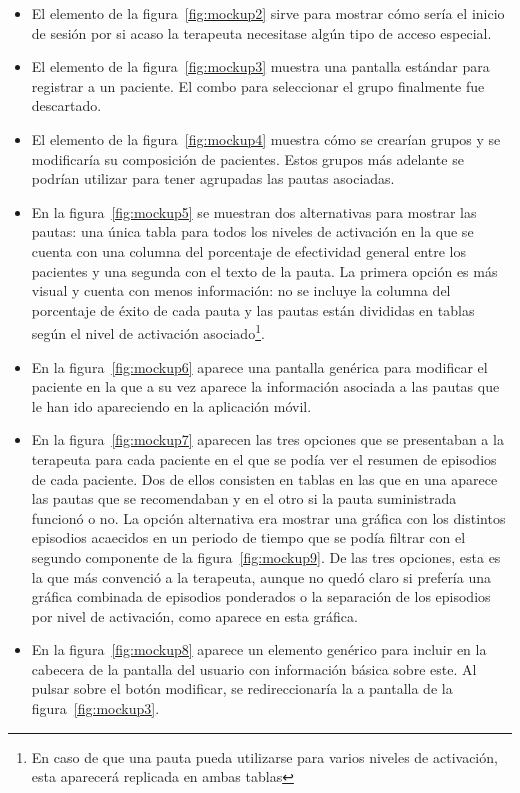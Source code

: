 \begin{itemize}
    \item El elemento de la figura~\ref{fig:mockup2} sirve para mostrar cómo sería el inicio de sesión por si acaso la terapeuta necesitase algún tipo de acceso especial.
    \item El elemento de la figura~\ref{fig:mockup3} muestra una pantalla estándar para registrar a un paciente. El combo para seleccionar el grupo finalmente fue descartado.
    \item El elemento de la figura~\ref{fig:mockup4} muestra cómo se crearían grupos y se modificaría su composición de pacientes. Estos grupos más adelante se podrían utilizar para tener agrupadas las pautas asociadas.
    \item En la figura~\ref{fig:mockup5} se muestran dos alternativas para mostrar las pautas: una única tabla para todos los niveles de activación en la que se cuenta con una columna del porcentaje de efectividad general entre los pacientes y una segunda con el texto de la pauta. La primera opción es más visual y cuenta con menos información: no se incluye la columna del porcentaje de éxito de cada pauta y las pautas están divididas en tablas según el nivel de activación asociado\footnote{En caso de que una pauta pueda utilizarse para varios niveles de activación, esta aparecerá replicada en ambas tablas}.
    \item En la figura~\ref{fig:mockup6} aparece una pantalla genérica para modificar el paciente en la que a su vez aparece la información asociada a las pautas que le han ido apareciendo en la aplicación móvil.
    \item En la figura~\ref{fig:mockup7} aparecen las tres opciones que se presentaban a la terapeuta para cada paciente en el que se podía ver el resumen de episodios de cada paciente. Dos de ellos consisten en tablas en las que en una aparece las pautas que se recomendaban y en el otro si la pauta suministrada funcionó o no. La opción alternativa era mostrar una gráfica con los distintos episodios acaecidos en un periodo de tiempo que se podía filtrar con el segundo componente de la figura~\ref{fig:mockup9}. De las tres opciones, esta es la que más convenció a la terapeuta, aunque no quedó claro si prefería una gráfica combinada de episodios ponderados o la separación de los episodios por nivel de activación, como aparece en esta gráfica.
    \item En la figura~\ref{fig:mockup8} aparece un elemento genérico para incluir en la cabecera de la pantalla del usuario con información básica sobre este. Al pulsar sobre el botón modificar, se redireccionaría la a pantalla de la figura~\ref{fig:mockup3}.

\end{itemize}
